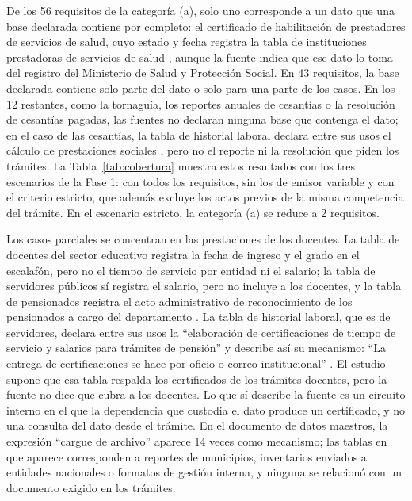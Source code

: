 De los 56 requisitos de la categoría (a), solo uno corresponde a un dato que una base declarada contiene por completo: el certificado de habilitación de prestadores de servicios de salud, cuyo estado y fecha registra la tabla de instituciones prestadoras de servicios de salud \parencite[p.~2]{gobernaciondelhuila2026datosmaestros}, aunque la fuente indica que ese dato lo toma del registro del Ministerio de Salud y Protección Social. En 43 requisitos, la base declarada contiene solo parte del dato o solo para una parte de los casos. En los 12 restantes, como la tornaguía, los reportes anuales de cesantías o la resolución de cesantías pagadas, las fuentes no declaran ninguna base que contenga el dato; en el caso de las cesantías, la tabla de historial laboral declara entre sus usos el cálculo de prestaciones sociales \parencite[p.~2]{gobernaciondelhuila2026datosmaestros}, pero no el reporte ni la resolución que piden los trámites. La Tabla~\ref{tab:cobertura} muestra estos resultados con los tres escenarios de la Fase 1: con todos los requisitos, sin los de emisor variable y con el criterio estricto, que además excluye los actos previos de la misma competencia del trámite. En el escenario estricto, la categoría (a) se reduce a 2 requisitos.

Los casos parciales se concentran en las prestaciones de los docentes. La tabla de docentes del sector educativo registra la fecha de ingreso y el grado en el escalafón, pero no el tiempo de servicio por entidad ni el salario; la tabla de servidores públicos sí registra el salario, pero no incluye a los docentes, y la tabla de pensionados registra el acto administrativo de reconocimiento de los pensionados a cargo del departamento \parencite[p.~2]{gobernaciondelhuila2026datosmaestros}. La tabla de historial laboral, que es de servidores, declara entre sus usos la \enquote{elaboración de certificaciones de tiempo de servicio y salarios para trámites de pensión} y describe así su mecanismo: \enquote{La entrega de certificaciones se hace por oficio o correo institucional} \parencite[p.~2]{gobernaciondelhuila2026datosmaestros}. El estudio supone que esa tabla respalda los certificados de los trámites docentes, pero la fuente no dice que cubra a los docentes. Lo que sí describe la fuente es un circuito interno en el que la dependencia que custodia el dato produce un certificado, y no una consulta del dato desde el trámite. En el documento de datos maestros, la expresión \enquote{cargue de archivo} aparece 14 veces como mecanismo; las tablas en que aparece corresponden a reportes de municipios, inventarios enviados a entidades nacionales o formatos de gestión interna, y ninguna se relacionó con un documento exigido en los trámites.

